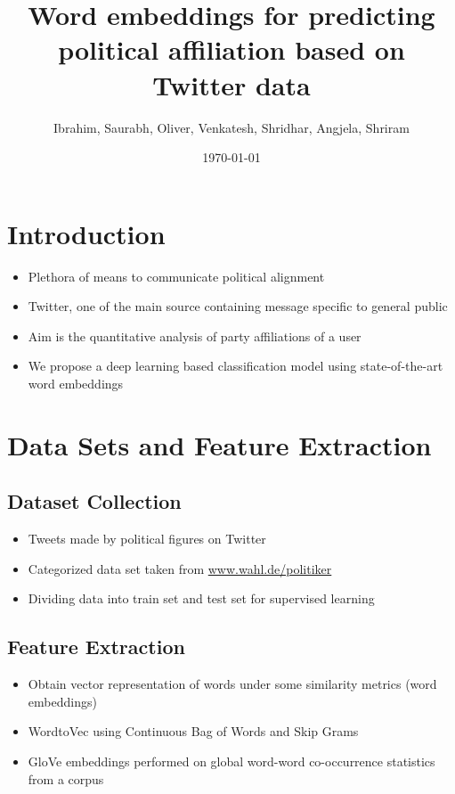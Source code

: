 \documentclass[final]{beamer}
\title
[Machine Learning 1, Kaiserslautern, Germany ] %
{ %
Word embeddings for predicting political affiliation based on
Twitter data
}
\author{ %
Ibrahim\inst{1}, Saurabh\inst{1}, Oliver\inst{1}, Venkatesh\inst{1}, Shridhar\inst{1}, Angjela\inst{1}, Shriram\inst{1}
}
\institute
[Technische Universität Kaiserslautern] %
{
\inst{1} Technische Universität Kaiserslautern\\[0.3ex]

}
\date{\today}
\begin{document}
\begin{frame}[t]
\begin{multicols}{3}

\section{Introduction}
\begin{itemize}
  \item Plethora of means to communicate political alignment
  \item Twitter, one of the main source containing message specific to general public
  \item Aim is the quantitative analysis of party affiliations of a user
  \item We propose a deep learning based classification model using state-of-the-art word embeddings
\end{itemize}

\section{Data Sets and Feature Extraction}

\subsection{Dataset Collection}
\begin{itemize}
  \item Tweets made by political figures on Twitter
  \item Categorized data set taken from \href{www.wahl.de/politiker}{www.wahl.de/politiker}
  \item Dividing data into train set and test set for supervised learning
\end{itemize}


\subsection{Feature Extraction}
\begin{itemize}
  \item Obtain vector representation of words under some similarity metrics (word embeddings)
  \item WordtoVec using Continuous Bag of Words and Skip Grams
  \item GloVe embeddings performed on global word-word co-occurrence statistics from a corpus
\end{itemize}


\end{multicols}
\end{frame}
\end{document}
